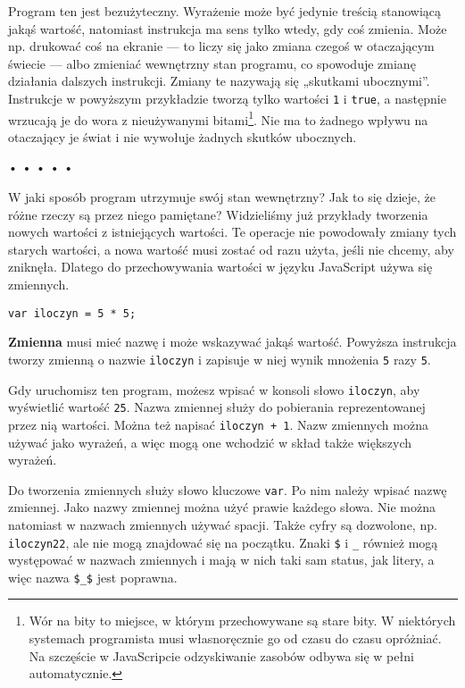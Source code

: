 Program ten jest bezużyteczny. Wyrażenie może być jedynie treścią stanowiącą jakąś wartość, natomiast instrukcja ma sens tylko wtedy, gdy coś zmienia. Może np. drukować coś na ekranie — to liczy się jako zmiana czegoś w otaczającym świecie — albo zmieniać wewnętrzny stan programu, co spowoduje zmianę działania dalszych instrukcji. Zmiany te nazywają się „skutkami ubocznymi”. Instrukcje w powyższym przykładzie tworzą tylko wartości \texttt{1} i \texttt{true}, a następnie wrzucają je do wora z nieużywanymi bitami\footnote{Wór na bity to miejsce, w którym przechowywane są stare bity. W niektórych systemach programista musi własnoręcznie go od czasu do czasu opróżniać. Na szczęście w JavaScripcie odzyskiwanie zasobów odbywa się w pełni automatycznie.}. Nie ma to żadnego wpływu na otaczający je świat i nie wywołuje żadnych skutków ubocznych.

  
\begin{center}
• • • • •
\end{center}
  
    
W jaki sposób program utrzymuje swój stan wewnętrzny? Jak to się dzieje, że różne rzeczy są przez niego pamiętane? Widzieliśmy już przykłady tworzenia nowych wartości z istniejących wartości. Te operacje nie powodowały zmiany tych starych wartości, a nowa wartość musi zostać od razu użyta, jeśli nie chcemy, aby zniknęła.  Dlatego do przechowywania wartości w języku JavaScript używa się zmiennych.

\begin{verbatim} 
var iloczyn = 5 * 5;
\end{verbatim}
    
\textbf{Zmienna} musi mieć nazwę i może wskazywać jakąś wartość. Powyższa instrukcja tworzy zmienną o nazwie \texttt{iloczyn} i zapisuje w niej wynik mnożenia \texttt{5} razy \texttt{5}.

    
Gdy uruchomisz ten program, możesz wpisać w konsoli słowo \texttt{iloczyn}, aby wyświetlić wartość \texttt{25}. Nazwa zmiennej służy do pobierania reprezentowanej przez nią wartości. Można też napisać \texttt{iloczyn + 1}. Nazw zmiennych można używać jako wyrażeń, a więc mogą one wchodzić w skład także większych wyrażeń.

    
Do tworzenia zmiennych służy słowo kluczowe \texttt{var}. Po nim należy wpisać nazwę zmiennej. Jako nazwy zmiennej można użyć prawie każdego słowa. Nie można natomiast w nazwach zmiennych używać spacji.  Także cyfry są dozwolone, np. \texttt{iloczyn22}, ale nie mogą znajdować się na początku. Znaki \texttt{\$} i \texttt{\_} również mogą występować w nazwach zmiennych i mają w nich taki sam status, jak litery, a więc nazwa \texttt{\$\_\$} jest poprawna.

